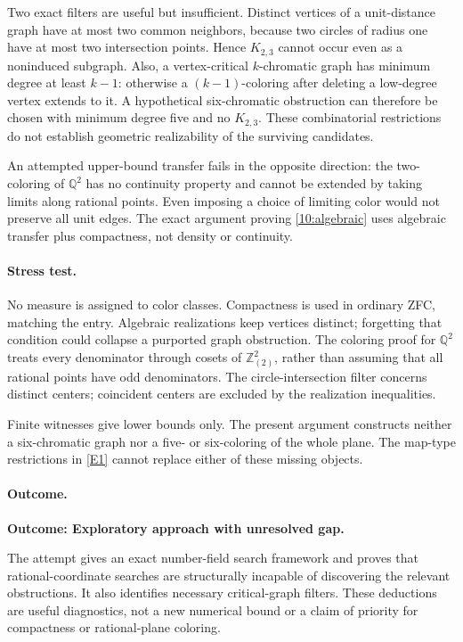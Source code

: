 \documentclass[11pt,a4paper]{article}
\newcommand{\Z}{\mathbb{Z}}
\newcommand{\Q}{\mathbb{Q}}
\newcommand{\eref}[2]{\hyperlink{extra:#1:#2}{[E#2]}}
\numberwithin{equation}{section}
\begin{document}
Two exact filters are useful but insufficient. Distinct vertices of a
unit-distance graph have at most two common neighbors, because two
circles of radius one have at most two intersection points. Hence $K_{2,3}$
cannot occur even as a noninduced subgraph. Also, a vertex-critical
$k$-chromatic graph has minimum degree at least $k-1$: otherwise a
$(k-1)$-coloring after deleting a low-degree vertex extends to it.
A hypothetical six-chromatic obstruction can therefore be chosen with
minimum degree five and no $K_{2,3}$. These combinatorial restrictions do
not establish geometric realizability of the surviving candidates.

An attempted upper-bound transfer fails in the opposite direction:
the two-coloring of $\Q^2$ has no continuity property and cannot be
extended by taking limits along rational points. Even imposing a
choice of limiting color would not preserve all unit edges. The exact
argument proving \eqref{10:algebraic} uses algebraic transfer plus
compactness, not density or continuity.

\paragraph{Stress test.}
No measure is assigned to color classes. Compactness is used in ordinary
ZFC, matching the entry. Algebraic realizations keep vertices distinct;
forgetting that condition could collapse a purported graph obstruction.
The coloring proof for $\Q^2$ treats every denominator through cosets of
$\Z_{(2)}^2$, rather than assuming that all rational points have odd
denominators. The circle-intersection filter concerns distinct centers;
coincident centers are excluded by the realization inequalities.

Finite witnesses give lower bounds only. The present argument constructs
neither a six-chromatic graph nor a five- or six-coloring of the whole
plane. The map-type restrictions in \eref{10}{1} cannot replace either
of these missing objects.

\paragraph{Outcome.}
\textbf{Outcome: Exploratory approach with unresolved gap.}

The attempt gives an exact number-field search framework and proves that
rational-coordinate searches are structurally incapable of discovering
the relevant obstructions. It also identifies necessary critical-graph
filters. These deductions are useful diagnostics, not a new numerical
bound or a claim of priority for compactness or rational-plane coloring.
\end{document}
